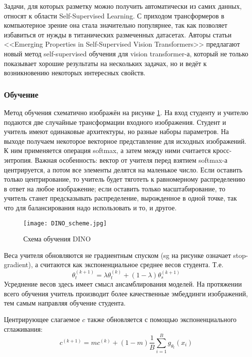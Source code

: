     Задачи, для которых разметку можно получить автоматически из самих данных, относят к области Self-Supervised Learning.
    С приходом трансформеров в компьютерное зрение она стала значительно популярнее, так как позволяет избавиться от нужды в титанических размеченных датасетах.
    Авторы статьи <<Emerging Properties in Self-Supervised Vision Transformers>> предлагают новый метод self-supervised обучения для vision transformer-а,
    который не только показывает хорошие результаты на нескольких задачах, но и ведёт к возникновению некоторых интересных свойств.
    
    \subsubsection{Обучение}
    Метод обучения схематично изображён на рисунке \ref{fig:dino_scheme}.
    На вход студенту и учителю подаются две случайные трансформации входного изображения.
    Студент и учитель имеют одинаковые архитектуры, но разные наборы параметров.
    На выходе получаем некоторое векторное представление для исходных изображений.
    К ним применяется операция softmax, а затем между ними считается кросс-энтропия.
    Важная особенность: вектор от учителя перед взятием softmax-а центрируется,
    а потом все элементы делятся на маленькое число.
    Если оставить только центрирование, то учитель будет тяготеть к равномерному распределению в ответ на любое изображение;
    если оставить только масштабирование, то учитель станет предсказывать распределение, вырожденное в одной точке,
    так что для балансирования надо использовать и то, и другое.
    
    \begin{figure}
        \centering
        \texttt{[image: DINO\_scheme.jpg]}
        \caption{Схема обучения DINO\label{fig:dino_scheme}}
    \end{figure}
    
    Веса учителя обновляются не градиентным спуском (sg на рисунке означает stop-gradient), а считаются как экспоненциальное среднее весов студента.
    Т.е.
    \begin{equation}
        \theta_t^{(k+1)} = \lambda \theta_t^{(k)} + (1 - \lambda) \theta_s^{(k + 1)}
    \end{equation}
    Усреднение весов здесь имеет смысл ансамблирования моделей.
    На протяжении всего обучения учитель производит более качественные эмбеддинги изображений, тем самым направляя обучение студента.

    Центрирующее слагаемое $c$ также обновляется с помощью экспоненциального сглаживания:
    \begin{equation}
        c^{(k + 1)} = m c^{(k)} + (1 - m) \frac{1}{B} \sum_{i=1}^B g_{\theta_t} (x_i)
    \end{equation}

